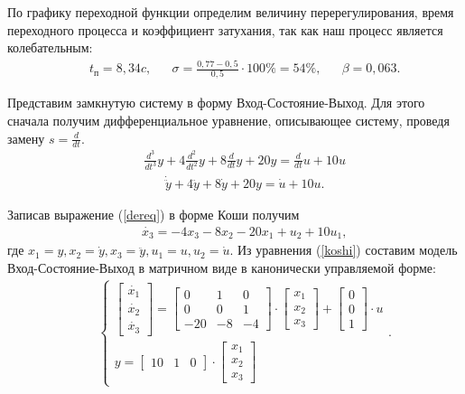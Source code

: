 \documentclass[fleqn, a4paper, 11pt, russian]{article}
\begin{document}
	По графику переходной функции определим величину перерегулирования, время переходного процесса и коэффициент затухания, так как наш процесс является колебательным:
	\begin{align}
		&&t_\text{п} = 8,34 c, &&\sigma = \frac{0,77 - 0,5}{0,5}\cdot100\% = 54\%, &&\beta = 0,063.
	\end{align}
	
	Представим замкнутую систему в форму Вход-Состояние-Выход. Для этого сначала получим дифференциальное уравнение, описывающее систему, проведя замену $s = \displaystyle{\frac{d}{dt}}.$
	\begin{align}
		&&\frac{d^3}{dt^3}y + 4\frac{d^2}{dt^2}y + 8\frac{d}{dt}y + 20y = \frac{d}{dt}u + 10u
	\end{align}
	\begin{align} \label{dereq}
		&&\dot{\ddot{y}} + 4\ddot{y} + 8\dot{y} + 20y = \dot{u} + 10u.
	\end{align}
	
	Записав выражение (\ref{dereq}) в форме Коши получим
	\begin{align} \label{koshi}
		&&\dot{x_3} = -4x_3 - 8x_2 - 20x_1 + u_2 + 10u_1,
	\end{align}
	где $x_1 = y, x_2 = \dot{y}, x_3 = \ddot{y}, u_1 = u, u_2 = \dot{u}$. Из уравнения (\ref{koshi}) составим модель Вход-Состояние-Выход в матричном виде в канонически управляемой форме:
	\begin{align}
		&&\begin{cases}
			\begin{bmatrix}
				\dot{x_1}\\
				\dot{x_2}\\
				\dot{x_3}
			\end{bmatrix} = \begin{bmatrix}
				0	&	1	&	0	\\
				0	&	0	&	1	\\
				-20	&	-8	&	-4				
			\end{bmatrix} \cdot \begin{bmatrix}
				x_1\\
				x_2\\
				x_3
			\end{bmatrix} + \begin{bmatrix}
				0\\
				0\\
				1
			\end{bmatrix} \cdot u\\
			y = \begin{bmatrix}
				10	&	1	&	0
			\end{bmatrix} \cdot \begin{bmatrix}
				x_1\\
				x_2\\
				x_3
			\end{bmatrix}
		\end{cases}.
	\end{align}
	
\end{document}
